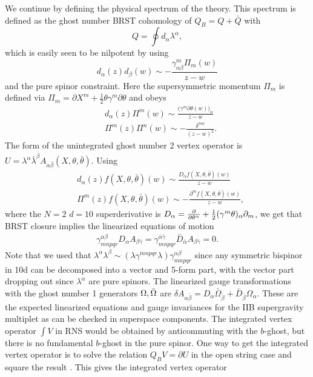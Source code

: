 \documentclass[12pt]{article}
\def\be{\begin{equation}}
\def\ee{\end{equation}}
\numberwithin{equation}{section}
\begin{document}
We continue by defining the physical spectrum of the theory. This spectrum is defined as the ghost number BRST cohomology of $Q_B = Q + \bar{Q}$ with
\be
Q = \oint d_\alpha \lambda^\alpha,
\ee
which is easily seen to be nilpotent by using
\be
d_\alpha(z)d_\beta(w) \sim -\frac{\gamma^m_{\alpha \beta}\Pi_m(w)}{z-w}
\ee
and the pure spinor constraint. Here the supersymmetric momentum $\Pi_m$ is defined via $\Pi_m = \partial X^m + \frac{1}{2}\theta \gamma^m \partial \theta$ and obeys
\begin{align}
	&d_\alpha(z) \Pi^m(w) \sim \frac{\big(\gamma^m \partial \theta(w)\big)_\alpha}{z-w} \\
	& \Pi^m(z) \Pi^n(w) \sim -\frac{\delta^{mn}}{(z-w)^2}.
\end{align}
The form of the unintegrated ghost number 2 vertex operator is $U = \lambda^\alpha \bar{\lambda}^{\bar{\beta}} A_{\alpha \bar{\beta}}(X, \theta, \bar{\theta})$. Using
\begin{align}
	&d_\alpha(z) f(X, \theta, \bar{\theta})(w) \sim \frac{D_\alpha f(X, \theta, \bar{\theta})(w)}{z-w} \\
	&\Pi^m(z) f(X, \theta, \bar{\theta})(w) \sim - \frac{\partial^m f(X, \theta, \bar{\theta})(w)}{z-w},
\end{align}
where the $N=2$ $d=10$ superderivative is $D_\alpha = \pdv{}{\theta^\alpha} + \frac{1}{2} (\gamma^m\theta)_\alpha \partial_m$, we get that BRST closure implies the linearized equations of motion
\begin{align}
	\gamma^{\alpha \beta}_{mnpqr} D_\alpha A_{\beta \bar{\gamma}} = \gamma^{\bar{\alpha} \bar{\gamma}}_{mnpqr} \bar{D}_{\bar{\alpha}} A_{\beta \bar{\gamma}} = 0.
\end{align}
Note that we used that $\lambda^\alpha \lambda^\beta \sim (\lambda \gamma^{mnpqr}\lambda)\gamma^{\alpha \beta}_{mnpqr}$ since any symmetric bispinor in 10d can be decomposed into a vector and 5-form part, with the vector part dropping out since $\lambda^\alpha$ are pure spinors.
The linearized gauge transformations with the ghost number 1 generators $\Omega, \Bar{\Omega}$ are $\delta A_{\alpha \bar{\beta}} = D_\alpha \bar{\Omega}_{\bar{\beta}} + \bar{D}_{\bar{\beta}} \Omega_\alpha$. These are the expected linearized equations and gauge invariances for the IIB supergravity multiplet \cite{Howe:1983sra} as can be checked in superspace components. The integrated vertex operator $\int V$ in RNS would be obtained by anticommuting with the $b$-ghost, but there is no fundamental $b$-ghost in the pure spinor. One way to get the integrated vertex operator is to solve the relation $Q_B V = \partial U$ in the open string case and square the result \cite{Berkovits:2000fe}. This gives the integrated vertex operator
\end{document}

